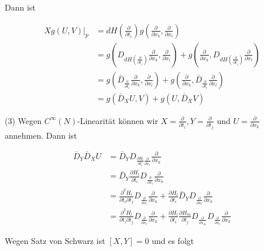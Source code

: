 \documentclass[10pt, letterpaper]{article}
\begin{document}
Dann ist

$$
\begin{aligned}
\left.X g(U, V)\right|_{p} & =d H\left(\frac{\partial}{\partial t_{i}}\right) g\left(\frac{\partial}{\partial x_{k}}, \frac{\partial}{\partial x_{l}}\right) \\
& =g\left(D_{d H\left(\frac{\partial}{\partial t_{i}}\right)} \frac{\partial}{\partial x_{k}}, \frac{\partial}{\partial x_{l}}\right)+g\left(\frac{\partial}{\partial x_{k}}, D_{d H\left(\frac{\partial}{\partial t_{i}}\right)} \frac{\partial}{\partial x_{l}}\right) \\
& =g\left(\bar{D}_{\frac{\partial}{\partial t_{i}}} \frac{\partial}{\partial x_{k}}, \frac{\partial}{\partial x_{l}}\right)+g\left(\frac{\partial}{\partial x_{k}}, \bar{D}_{\frac{\partial}{\partial t_{i}}} \frac{\partial}{\partial x_{l}}\right) \\
& =g\left(\bar{D}_{X} U, V\right)+g\left(U, \bar{D}_{X} V\right)
\end{aligned}
$$

(3) Wegen $C^{\infty}(N)$-Linearität können wir $X=\frac{\partial}{\partial t_{i}}, Y=\frac{\partial}{\partial t_{j}}$ und $U=\frac{\partial}{\partial x_{k}}$ annehmen. Dann ist

$$
\begin{aligned}
\bar{D}_{Y} \bar{D}_{X} U & =\bar{D}_{Y} D_{\frac{\partial H_{l}}{\partial t_{i}} \frac{\partial}{\partial x_{l}}} \frac{\partial}{\partial x_{k}} \\
& =\bar{D}_{Y} \frac{\partial H_{l}}{\partial t_{i}} D_{\frac{\partial}{\partial x_{l}}} \frac{\partial}{\partial x_{k}} \\
& =\frac{\partial^{2} H_{l}}{\partial t_{i} \partial t_{j}} D_{\frac{\partial}{\partial x_{l}}} \frac{\partial}{\partial x_{k}}+\frac{\partial H_{l}}{\partial t_{i}} \bar{D}_{Y} D_{\frac{\partial}{\partial x_{l}}} \frac{\partial}{\partial x_{k}} \\
& =\frac{\partial^{2} H_{l}}{\partial t_{i} \partial t_{j}} D_{\frac{\partial}{\partial x_{l}}} \frac{\partial}{\partial x_{k}}+\frac{\partial H_{l}}{\partial t_{i}} \frac{\partial H_{m}}{\partial t_{j}} D_{\frac{\partial}{\partial x_{m}}} D_{\frac{\partial}{\partial x_{l}}} \frac{\partial}{\partial x_{k}}
\end{aligned}
$$

Wegen Satz von Schwarz ist $[X, Y]=0$ und es folgt
\end{document}
